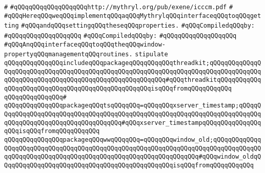 \verb|#|\newline
\verb|#qQQqqQQqqQQqqQQqqQQqhttp://mythryl.org/pub/exene/icccm.pdf|\newline
\verb|#|\newline
\verb|#qQQqHereqQQqweqQQqimplementqQQqaqQQqMythrylqQQqinterfaceqQQqtoqQQqgetting|\newline
\verb|#qQQqandqQQqsettingqQQqtheseqQQqproperties.|\newline
\newline
\verb|#qQQqCompiledqQQqby:|\newline
\verb|#qQQqqQQqqQQqqQQqqQQq|\newline
\newline
\newline
\verb|#qQQqCompiledqQQqby:|\newline
\verb|#qQQqqQQqqQQqqQQqqQQq|\newline
\newline
\newline
\newline
\verb|#qQQqAnqQQqinterfaceqQQqtoqQQqtheqQQqwindow-propertyqQQqmanagementqQQqroutines.|\newline
\newline
\verb|stipulate|\newline
\verb|qQQqqQQqqQQqqQQqincludeqQQqpackageqQQqqQQqqQQqthreadkit;qQQqqQQqqQQqqQQqqQQqqQQqqQQqqQQqqQQqqQQqqQQqqQQqqQQqqQQqqQQqqQQqqQQqqQQqqQQqqQQqqQQqqQQqqQQqqQQqqQQqqQQqqQQqqQQqqQQqqQQqqQQqqQQq#qQQqthreadkitqQQqqQQqqQQqqQQqqQQqqQQqqQQqqQQqqQQqqQQqqQQqqQQqqQQqisqQQqfromqQQqqQQqqQQq|\newline
\verb|qQQqqQQqqQQqqQQq#|\newline
\verb|qQQqqQQqqQQqqQQqpackageqQQqtsqQQqqQQq=qQQqqQQqxserver_timestamp;qQQqqQQqqQQqqQQqqQQqqQQqqQQqqQQqqQQqqQQqqQQqqQQqqQQqqQQqqQQqqQQqqQQqqQQqqQQqqQQqqQQqqQQqqQQqqQQqqQQqqQQqqQQq#qQQqxserver_timestampqQQqqQQqqQQqqQQqqQQqisqQQqfromqQQqqQQqqQQq|\newline
\verb|qQQqqQQqqQQqqQQqpackageqQQqwwqQQqqQQq=qQQqqQQqwindow_old;qQQqqQQqqQQqqQQqqQQqqQQqqQQqqQQqqQQqqQQqqQQqqQQqqQQqqQQqqQQqqQQqqQQqqQQqqQQqqQQqqQQqqQQqqQQqqQQqqQQqqQQqqQQqqQQqqQQqqQQqqQQqqQQqqQQqqQQq#qQQqwindow_oldqQQqqQQqqQQqqQQqqQQqqQQqqQQqqQQqqQQqqQQqqQQqqQQqisqQQqfromqQQqqQQqqQQq|\newline
